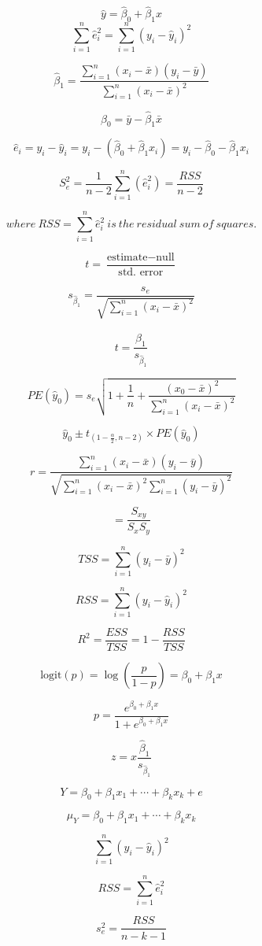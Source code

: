 \documentclass{article}
\begin{document}
\[
\hat{y}=\hat{\beta}_0+\hat{\beta}_1x
\]
\[
\sum_{i=1}^{n}\hat{e}^2_i = \sum_{i=1}^{n}(y_i - \hat{y}_i )^2
\]


\[
\hat{\beta}_1 = \frac{\sum_{i=1}^{n}(x_i - \bar{x})(y_i - \bar{y})}{\sum_{i=1}^{n}(x_i - \bar{x})^2}
\]

\[
\hat{\beta}_0 = \bar{y} - \hat{\beta}_1 \bar{x}
\]

\[
\hat{e}_i = y_i - \hat{y}_i = y_i - (\hat{\beta}_0 + \hat{\beta}_1 x_i) = y_i - \hat{\beta}_0 - \hat{\beta}_1 x_i
\]

\[
S^2_e = \frac{1}{n-2}\sum_{i=1}^{n}(\hat{e}^2_i)=\frac{RSS}{n-2}
\]

\[
where \ RSS = \sum_{i=1}^{n}\hat{e}^2_i \ is \ the \ residual \ sum \ of \ squares.
\]

\[
t = \frac{\text{estimate} - \text{null}}{\text{std. error}}
\]

\[
s_{\hat{\beta}_1} = \frac{s_e}{\sqrt{\sum_{i=1}^{n}(x_i - \bar{x})^2}}
\]

\[
t = \frac{\hat{\beta}_1}{s_{\hat{\beta}_1}}
\]

\[
PE(\hat{y}_0) = s_e\sqrt{1 + \frac{1}{n} + \frac{(x_0 - \bar{x})^2}{\sum_{i=1}^{n}(x_i - \bar{x})^2}}
\]

\[
\hat{y}_0 \pm t_{(1-\frac{\alpha}{2}, n-2)} \times PE(\hat{y}_0)
\]

\[
r = \frac{\sum_{i=1}^{n} (x_i - \bar{x})(y_i - \bar{y})}{\sqrt{\sum_{i=1}^{n}(x_i - \bar{x})^2 \sum_{i=1}^{n}(y_i - \bar{y})^2}}
\]

\[
= \frac{S_{xy}}{S_x S_y}
\]

\[
TSS = \sum_{i=1}^{n} (y_i - \bar{y})^2
\]

\[
RSS = \sum_{i=1}^{n} (y_i - \hat{y}_i)^2
\]

\[
R^2 = \frac{ESS}{TSS} = 1 - \frac{RSS}{TSS}
\]

\[
\text{logit}(p) = \log\left(\frac{p}{1-p}\right) = \beta_0 + \beta_1x
\]

\[
p = \frac{e^{\beta_0 + \beta_1x}}{1+e^{\beta_0 + \beta_1x}}
\]

\[
z = x\frac{\hat{\beta}_1}{s_{\hat{\beta}_1}}
\]

\[
Y = \beta_0 + \beta_1x_1 + \cdots + \beta_kx_k + e
\]

\[
\mu_Y = \beta_0 + \beta_1x_{1} + \cdots + \beta_kx_{k}
\]

\[
\sum_{i=1}^{n} (y_i - \hat{y}_i)^2
\]

\[
RSS = \sum_{i=1}^{n} \hat{e}_i^2
\]

\[
s_e^2 = \frac{RSS}{n - k - 1}
\]
\end{document}
